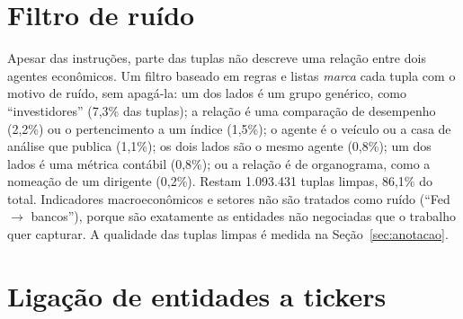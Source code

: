 \section{Filtro de ruído}
\label{sec:ruido}

Apesar das instruções, parte das tuplas não descreve uma relação entre dois agentes econômicos. Um
filtro baseado em regras e listas \emph{marca} cada tupla com o motivo de ruído, sem apagá-la: um dos
lados é um grupo genérico, como ``investidores'' (7,3\% das tuplas); a relação é uma comparação de
desempenho (2,2\%) ou o pertencimento a um índice (1,5\%); o agente é o veículo ou a casa de análise que
publica (1,1\%); os dois lados são o mesmo agente (0,8\%); um dos lados é uma métrica contábil (0,8\%); ou a
relação é de organograma, como a nomeação de um dirigente (0,2\%). Restam 1.093.431 tuplas limpas, 86,1\%
do total. Indicadores macroeconômicos e setores não são tratados como ruído (``Fed $\to$ bancos''),
porque são exatamente as entidades não negociadas que o trabalho quer capturar. A qualidade das tuplas
limpas é medida na Seção~\ref{sec:anotacao}.

\section{Ligação de entidades a tickers}
\label{sec:link}

